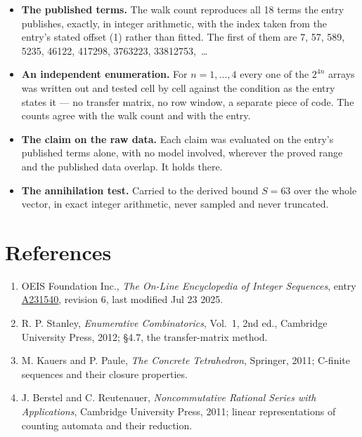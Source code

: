 \documentclass[11pt]{article}
\theoremstyle{definition}
\begin{document}
\begin{itemize}

\item {\bfseries The published terms.} The walk count reproduces all 18 terms the entry publishes, exactly, in integer arithmetic, with the index taken from the entry's stated offset (1) rather than fitted. The first of them are 7, 57, 589, 5235, 46122, 417298, 3763223, 33812753,~\dots

\item {\bfseries An independent enumeration.} For $n = 1,\dots,4$ every one of the $2^{4n}$ arrays was written out and tested cell by cell against the condition as the entry states it --- no transfer matrix, no row window, a separate piece of code. The counts agree with the walk count and with the entry.

\item {\bfseries The claim on the raw data.} Each claim was evaluated on the entry's published terms alone, with no model involved, wherever the proved range and the published data overlap. It holds there.

\item {\bfseries The annihilation test.} Carried to the derived bound $S = 63$ over the whole vector, in exact integer arithmetic, never sampled and never truncated.

\end{itemize}

\section{References}

\begin{enumerate}

\item OEIS Foundation Inc., \emph{The On-Line Encyclopedia of Integer Sequences}, entry \href{https://oeis.org/A231540}{A231540}, revision 6, last modified Jul 23 2025.

\item R. P. Stanley, \emph{Enumerative Combinatorics}, Vol.~1, 2nd ed., Cambridge University Press, 2012; \S4.7, the transfer-matrix method.

\item M. Kauers and P. Paule, \emph{The Concrete Tetrahedron}, Springer, 2011; C-finite sequences and their closure properties.

\item J. Berstel and C. Reutenauer, \emph{Noncommutative Rational Series with Applications}, Cambridge University Press, 2011; linear representations of counting automata and their reduction.

\end{enumerate}
\end{document}
